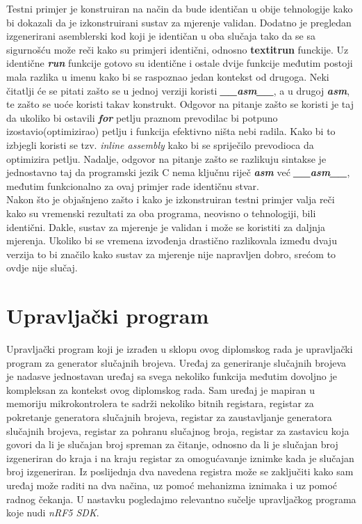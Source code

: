 Testni primjer je konstruiran na način da bude identičan u obije tehnologije kako bi dokazali da je izkonstruirani sustav za mjerenje validan. Dodatno je pregledan izgenerirani asemblerski kod koji je identičan u oba slučaja tako da se sa sigurnošću može reči kako su primjeri identični, odnosno \textbf{textit{run}} funckije. Uz identične \textbf{\textit{run}} funkcije gotovo su identične i ostale dvije funkcije međutim postoji mala razlika u imenu kako bi se raspoznao jedan kontekst od drugoga. Neki čitatlji će se pitati zašto se u jednoj verziji koristi \textbf{\textit{\_\_asm\_\_}}, a u drugoj \textbf{\textit{asm}}, te zašto se uoće koristi takav konstrukt. Odgovor na pitanje zašto se koristi je taj da ukoliko bi ostavili \textbf{\textit{for}} petlju praznom prevodilac bi potpuno izostavio(optimizirao) petlju i funkcija efektivno ništa nebi radila. Kako bi to izbjegli koristi se tzv. \textit{inline assembly} kako bi se spriječilo prevodioca da optimizira petlju. Nadalje, odgovor na pitanje zašto se razlikuju sintakse je jednostavno taj da programski jezik C nema ključnu riječ \textbf{\textit{asm}} već \textbf{\textit{\_\_asm\_\_}}, međutim funkcionalno za ovaj primjer rade identičnu stvar.\\
Nakon što je objašnjeno zašto i kako je izkonstruiran testni primjer valja reči kako su vremenski rezultati za oba programa, neovisno o tehnologiji, bili identični. Dakle, sustav za mjerenje je validan i može se koristiti za daljnja mjerenja. Ukoliko bi se vremena izvođenja drastično razlikovala između dvaju verzija to bi značilo kako sustav za mjerenje nije napravljen dobro, srećom to ovdje nije slučaj. 

\section{Upravljački program}
Upravljački program koji je izrađen u sklopu ovog diplomskog rada je upravljački program za generator slučajnih brojeva. Uređaj za generiranje slučajnih brojeva je nadasve jednostavan uređaj sa svega nekoliko funkcija međutim dovoljno je kompleksan za kontekst ovog diplomskog rada. Sam uređaj je mapiran u memoriju mikrokontrolera te sadrži nekoliko bitnih registara, registar za pokretanje generatora slučajnih brojeva, registar za zaustavljanje generatora slučajnih brojeva, registar za pohranu slučajnog broja, registar za zastavicu koja govori da li je slučajan broj spreman za čitanje, odnosno da li je slučajan broj izgeneriran do kraja i na kraju registar za omogućavanje iznimke kada je slučajan broj izgeneriran. Iz poslijednja dva navedena registra može se zaključiti kako sam uređaj može raditi na dva načina, uz pomoć mehanizma iznimaka i uz pomoć radnog čekanja. U nastavku pogledajmo relevantno sučelje upravljačkog programa koje nudi \textit{nRF5 SDK}. 

